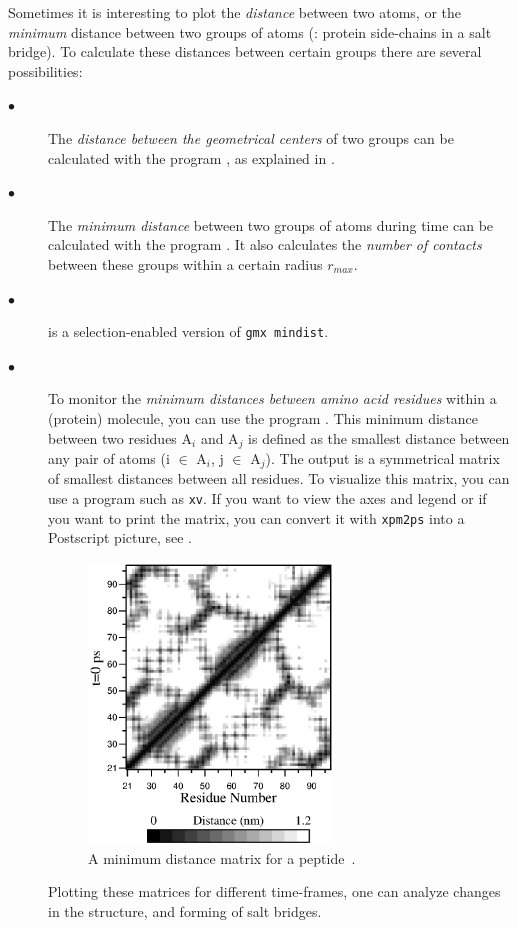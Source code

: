 Sometimes it is interesting to plot the {\em distance} between two atoms,
or the {\em minimum} distance between two groups of atoms
({\eg}: protein side-chains in a salt bridge). 
To calculate these distances between certain groups there are several 
possibilities:
\begin{description}
\item[$\bullet$] 
The {\em distance between the geometrical centers} of two groups can be 
calculated with the program
{{\tt {}}, as explained in .}
\item[$\bullet$]
The {\em minimum distance} between two groups of atoms during time 
can be calculated with the program {\tt {}}. It also calculates the 
{\em number of contacts} between these groups 
within a certain radius $r_{max}$.
\item[$\bullet$]
{\tt {}} is a selection-enabled version of
{\tt gmx mindist}.
\item[$\bullet$]
To monitor the {\em minimum distances between amino acid residues} 
within a (protein) molecule, you can use 
the program {\tt {}}. This minimum distance between two residues
A$_i$ and A$_j$ is defined as the smallest distance between any pair of 
atoms (i $\in$ A$_i$, j $\in$ A$_j$).
The output is a symmetrical matrix of smallest distances 
between all residues.
To visualize this matrix, you can use a program such as {\tt xv}.
If you want to view the axes and legend or if you want to print
the matrix, you can convert it with 
{\tt xpm2ps} into a Postscript picture, see .
\begin{figure}
\centerline{
\includegraphics[width=6.5cm]{plots/distm}}
\caption{A minimum distance matrix for a peptide~\protect\cite{Spoel96b}.}
\label{fig:mdmat}
\end{figure}

Plotting these matrices for different time-frames, one can analyze changes 
in the structure, and {\eg} forming of salt bridges.
\end{description}

